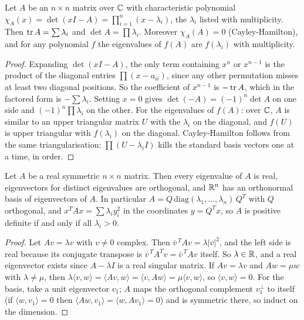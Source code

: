 \begin{theorem}
Let $A$ be an $n\times n$ matrix over $\mathbb{C}$ with characteristic polynomial $\chi_A(x)=\det(xI-A)=\prod_{i=1}^n(x-\lambda_i)$, the $\lambda_i$ listed with multiplicity. Then $\operatorname{tr} A=\sum\lambda_i$ and $\det A=\prod\lambda_i$. Moreover $\chi_A(A)=0$ (Cayley-Hamilton), and for any polynomial $f$ the eigenvalues of $f(A)$ are $f(\lambda_i)$ with multiplicity.
\end{theorem}

\begin{proof}
Expanding $\det(xI-A)$, the only term containing $x^{n}$ or $x^{n-1}$ is the product of the diagonal entries $\prod(x-a_{ii})$, since any other permutation misses at least two diagonal positions. So the coefficient of $x^{n-1}$ is $-\operatorname{tr} A$, which in the factored form is $-\sum\lambda_i$. Setting $x=0$ gives $\det(-A)=(-1)^n\det A$ on one side and $(-1)^n\prod\lambda_i$ on the other. For the eigenvalues of $f(A)$: over $\mathbb{C}$, $A$ is similar to an upper triangular matrix $U$ with the $\lambda_i$ on the diagonal, and $f(U)$ is upper triangular with $f(\lambda_i)$ on the diagonal. Cayley-Hamilton follows from the same triangularisation: $\prod(U-\lambda_iI)$ kills the standard basis vectors one at a time, in order.
\end{proof}

\begin{theorem}
Let $A$ be a real symmetric $n\times n$ matrix. Then every eigenvalue of $A$ is real, eigenvectors for distinct eigenvalues are orthogonal, and $\mathbb{R}^n$ has an orthonormal basis of eigenvectors of $A$. In particular $A=Q\,\mathrm{diag}(\lambda_1,\dots,\lambda_n)\,Q^{T}$ with $Q$ orthogonal, and $x^TAx=\sum\lambda_iy_i^2$ in the coordinates $y=Q^Tx$, so $A$ is positive definite if and only if all $\lambda_i>0$.
\end{theorem}

\begin{proof}
Let $Av=\lambda v$ with $v\ne 0$ complex. Then $\bar v^{\,T}Av=\lambda|v|^2$, and the left side is real because its conjugate transpose is $\bar v^{\,T}A^{T}v=\bar v^{\,T}Av$ itself. So $\lambda\in\mathbb{R}$, and a real eigenvector exists since $A-\lambda I$ is a real singular matrix. If $Av=\lambda v$ and $Aw=\mu w$ with $\lambda\ne\mu$, then $\lambda\langle v,w\rangle=\langle Av,w\rangle=\langle v,Aw\rangle=\mu\langle v,w\rangle$, so $\langle v,w\rangle=0$. For the basis, take a unit eigenvector $v_1$; $A$ maps the orthogonal complement $v_1^\perp$ to itself (if $\langle w,v_1\rangle=0$ then $\langle Aw,v_1\rangle=\langle w,Av_1\rangle=0$) and is symmetric there, so induct on the dimension.
\end{proof}

